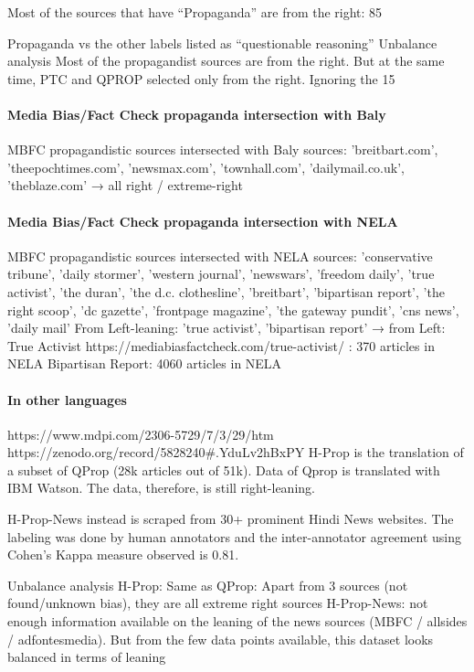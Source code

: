 Most of the sources that have “Propaganda” are from the right: 85%

Propaganda vs the other labels listed as “questionable reasoning”
Unbalance analysis
Most of the propagandist sources are from the right. But at the same time, PTC and QPROP selected only from the right. Ignoring the 15%

\paragraph{Media Bias/Fact Check propaganda intersection with Baly}
MBFC propagandistic sources intersected with Baly sources:
{'breitbart.com',  'theepochtimes.com',  'newsmax.com',  'townhall.com',  'dailymail.co.uk',  'theblaze.com'} → all right / extreme-right

\paragraph{Media Bias/Fact Check propaganda intersection with NELA}
MBFC propagandistic sources intersected with NELA sources:
{'conservative tribune', 'daily stormer', 'western journal', 'newswars', 'freedom daily', 'true activist', 'the duran', 'the d.c. clothesline', 'breitbart', 'bipartisan report', 'the right scoop', 'dc gazette', 'frontpage magazine', 'the gateway pundit', 'cns news', 'daily mail'} 
From Left-leaning:
{'true activist', 'bipartisan report'} → from Left:
True Activist https://mediabiasfactcheck.com/true-activist/ : 370 articles in NELA
Bipartisan Report: 4060 articles in NELA

\paragraph{In other languages}
https://www.mdpi.com/2306-5729/7/3/29/htm 
https://zenodo.org/record/5828240#.YduLv2hBxPY 
H-Prop is the translation of a subset of QProp (28k articles out of 51k). Data of Qprop is translated with IBM Watson.
The data, therefore, is still right-leaning.

H-Prop-News instead is scraped from 30+ prominent Hindi News websites. The labeling was done by human annotators and the inter-annotator agreement using Cohen’s Kappa measure observed is 0.81.


Unbalance analysis
H-Prop: Same as QProp: Apart from 3 sources (not found/unknown bias), they are all extreme right sources
H-Prop-News: not enough information available on the leaning of the news sources (MBFC / allsides / adfontesmedia). But from the few data points available, this dataset looks balanced in terms of leaning



